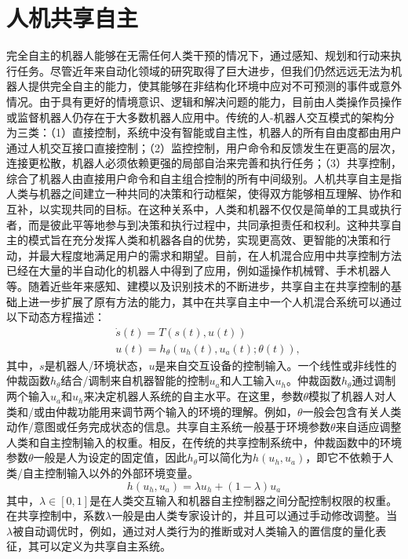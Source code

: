 \section{人机共享自主}
完全自主的机器人能够在无需任何人类干预的情况下，通过感知、规划和行动来执行任务。尽管近年来自动化领域的研究取得了巨大进步，但我们仍然远远无法为机器人提供完全自主的能力，使其能够在非结构化环境中应对不可预测的事件或意外情况。由于具有更好的情境意识、逻辑和解决问题的能力，目前由人类操作员操作或监督机器人仍存在于大多数机器人应用中。传统的人-机器人交互模式的架构分为三类：（1）直接控制，系统中没有智能或自主性，机器人的所有自由度都由用户通过人机交互接口直接控制；（2）监控控制，用户命令和反馈发生在更高的层次，连接更松散，机器人必须依赖更强的局部自治来完善和执行任务；（3）共享控制，综合了机器人由直接用户命令和自主组合控制的所有中间级别。人机共享自主是指人类与机器之间建立一种共同的决策和行动框架，使得双方能够相互理解、协作和互补，以实现共同的目标。在这种关系中，人类和机器不仅仅是简单的工具或执行者，而是彼此平等地参与到决策和执行过程中，共同承担责任和权利。这种共享自主的模式旨在充分发挥人类和机器各自的优势，实现更高效、更智能的决策和行动，并最大程度地满足用户的需求和期望\cite{selvaggioAutonomyPhysicalHumanRobot2021a}。目前，在人机混合应用中共享控制方法已经在大量的半自动化的机器人中得到了应用，例如遥操作机械臂、手术机器人等。随着近些年来感知、建模以及识别技术的不断进步，共享自主在共享控制的基础上进一步扩展了原有方法的能力，其中在共享自主中一个人机混合系统可以通过以下动态方程描述：
\begin{equation}
    \begin{aligned}
    & \dot{s}(t)=T(s(t), u(t)) \\
    & u(t)=h_\theta\left(u_h(t), u_a(t) ; \theta(t)\right),
    \end{aligned}
    \label{eq:2-1}
\end{equation}
其中，$s$是机器人/环境状态，$u$是来自交互设备的控制输入。一个线性或非线性的仲裁函数$h_θ$结合/调制来自机器智能的控制$u_a$和人工输入$u_h$。仲裁函数$h_θ$通过调制两个输入$u_a$和$u_h$来决定机器人系统的自主水平。在这里，参数$θ$模拟了机器人对人类和/或由仲裁功能用来调节两个输入的环境的理解。例如，$θ$一般会包含有关人类动作/意图或任务完成状态的信息。共享自主系统一般基于环境参数$θ$来自适应调整人类和自主控制输入的权重。相反，在传统的共享控制系统中，仲裁函数中的环境参数$θ$一般是人为设定的固定值，因此$h_θ$可以简化为$h(u_h,u_a)$，即它不依赖于人类/自主控制输入以外的外部环境变量。
\begin{equation}
    h\left(u_h, u_a\right)=\lambda u_h+(1-\lambda) u_a
    \label{eq:2-2}
\end{equation}
其中，$\lambda∈[0,1]$是在人类交互输入和机器自主控制器之间分配控制权限的权重。在共享控制中，系数$\lambda$一般是由人类专家设计的，并且可以通过手动修改调整。当$\lambda$被自动调优时，例如，通过对人类行为的推断或对人类输入的置信度的量化表征，其可以定义为共享自主系统。

